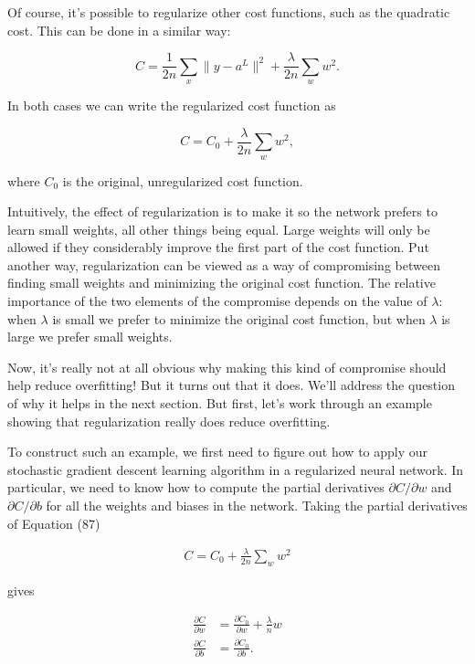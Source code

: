Of course, it's possible to regularize other cost functions, such as the quadratic cost. This can be done in a similar way:

\begin{equation}
C = \frac{1}{2n} \sum_x \|y-a^L\|^2 + \frac{\lambda}{2n} \sum_w w^2.
\tag{86}
\end{equation}

\noindent In both cases we can write the regularized cost function as

\begin{equation}
C = C_0 + \frac{\lambda}{2n} \sum_w w^2,
\tag{87}
\end{equation}

\noindent where $C_0$ is the original, unregularized cost function.


Intuitively, the effect of regularization is to make it so the network prefers to learn small weights, all other things being equal. Large weights will only be allowed if they considerably improve the first part of the cost function. Put another way, regularization can be viewed as a way of compromising between finding small weights and minimizing the original cost function. The relative importance of the two elements of the compromise depends on the value of $\lambda$: when $\lambda$ is small we prefer to minimize the original cost function, but when $\lambda$ is large we prefer small weights.


Now, it's really not at all obvious why making this kind of compromise should help reduce overfitting! But it turns out that it does. We'll address the question of why it helps in the next section. But first, let's work through an example showing that regularization really does reduce overfitting.


To construct such an example, we first need to figure out how to apply our stochastic gradient descent learning algorithm in a regularized neural network. In particular, we need to know how to compute the partial derivatives $\partial C / \partial w$ and $\partial C / \partial b$ for all the weights and biases in the network. Taking the partial derivatives of Equation (87)

\begin{align*}
C = C_0 + \frac{\lambda}{2n} \sum_w w^2 \nonumber
\end{align*}

\noindent gives

\begin{align}
\frac{\partial C}{\partial w} &= \frac{\partial C_0}{\partial w} + \frac{\lambda}{n} w \tag{88} \\ \frac{\partial C}{\partial b} &= \frac{\partial C_0}{\partial b}. \tag{89}
\end{align}

